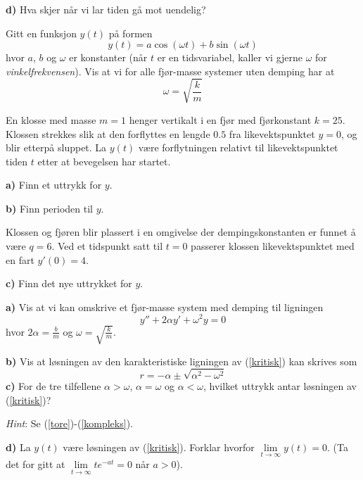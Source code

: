 \textbf{d)} Hva skjer når vi lar tiden gå mot uendelig?

Gitt en funksjon $ y(t) $ på formen
\[y(t) =a\cos (\omega t) +b\sin (\omega t) \] 
hvor $ a $, $ b $ og $ \omega $ er konstanter (når $ t $ er en tidsvariabel, kaller vi gjerne $ \omega $ for \textit{vinkelfrekvensen}). Vis at vi for alle fjør-masse systemer uten demping har at
\[ \omega=\sqrt{\frac{k}{m}} \] 

En klosse med masse $ {m=1} $ henger vertikalt i en fjør med fjørkonstant $ {k=25} $. Klossen strekkes slik at den forflyttes en lengde $ 0.5 $ fra likevektspunktet $ {y=0} $, og blir etterpå sluppet. La $ y(t) $ være forflytningen relativt til likevektspunktet tiden $ t $ etter at bevegelsen har startet.\os

\textbf{a)} Finn et uttrykk for $ y $.\os

\textbf{b)} Finn perioden til $ y $.

Klossen og fjøren blir plassert i en omgivelse der dempingskonstanten er funnet å være $ {q=6} $. Ved et tidspunkt satt til $ {t=0} $ passerer klossen likevektspunktet med en fart $ y'(0)=4 $.\os

\textbf{c)} Finn det nye uttrykket for $ y $. 

\ekspop
\textbf{a)} Vis at vi kan omskrive et fjør-masse system med demping til ligningen
\[ y''+2\alpha y'+\omega^2y=0 \tag{I}\label{kritisk} \]
hvor $ 2\alpha=\frac{b}{m} $ og $ \omega=\sqrt{\frac{k}{m}} $.\os

\textbf{b)} Vis at løsningen av den karakteristiske ligningen av (\ref{kritisk}) kan skrives som
\[ r=-\alpha\pm\sqrt{\alpha^2-\omega^2} \]
\textbf{c)} For de tre tilfellene $ \alpha>\omega $, $ \alpha=\omega $ og $ \alpha<\omega $, hvilket uttrykk antar løsningen av (\ref{kritisk})? \os

\textsl{Hint}: Se (\ref{tore})-(\ref{kompleks}).\os%

\textbf{d)} La $ y(t) $ være løsningen av (\ref{kritisk}). Forklar hvorfor $ \lim\limits_{t\to\infty}y(t) =0 $. (Ta det for gitt at $ \lim\limits_{t\to \infty} te^{-at}=0 $ når $ a>0 $).
